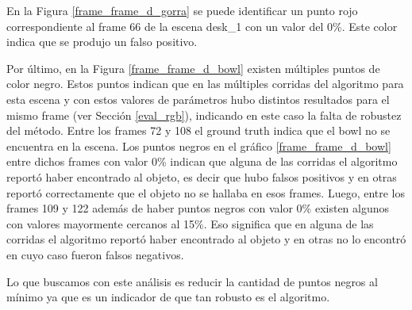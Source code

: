 En la Figura \ref{frame_frame_d_gorra} se puede identificar un punto rojo correspondiente al frame 66 de la escena desk\_1 con un valor del 0\%. Este color indica que se produjo un falso positivo.

Por último, en la Figura \ref{frame_frame_d_bowl} existen múltiples puntos de color negro. Estos puntos indican que en las múltiples corridas del algoritmo para esta escena y con estos valores de parámetros hubo distintos resultados para el mismo frame (ver Sección \ref{eval_rgb}), indicando en este caso la falta de robustez del método. Entre los frames 72 y 108 el ground truth indica que el bowl no se encuentra en la escena. Los puntos negros en el gráfico \ref{frame_frame_d_bowl} entre dichos frames con valor 0\% indican que alguna de las corridas el algoritmo reportó haber encontrado al objeto, es decir que hubo falsos positivos y en otras reportó correctamente que el objeto no se hallaba en esos frames. Luego, entre los frames 109 y 122 además de haber puntos negros con valor 0\% existen algunos con valores mayormente cercanos al 15\%. Eso significa que en alguna de las corridas el algoritmo reportó haber encontrado al objeto y en otras no lo encontró en cuyo caso fueron falsos negativos.

Lo que buscamos con este análisis es reducir la cantidad de puntos negros al mínimo ya que es un indicador de que tan robusto es el algoritmo.

